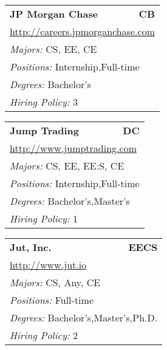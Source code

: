 \documentclass[twoside]{article}
\begin{document}
\begin{center}
\begin{multicols}{3}
\begin{FlushLeft}
\begin{minipage}{\columnwidth}
\end{minipage}
 
\begin{minipage}{\columnwidth}\begin{tabularx}{.95\columnwidth}{Xr}
                 {\Large\bf JP Morgan Chase} & {\Large\bf CB}\\
    \multicolumn{2}{p{.95\columnwidth}}{\url{http://careers.jpmorganchase.com}}\\
    \multicolumn{2}{p{.95\columnwidth}}{\emph{Majors:} CS, EE, CE}\\
    \multicolumn{2}{p{.95\columnwidth}}{\emph{Positions:} Internship,Full-time}\\
    \multicolumn{2}{p{.95\columnwidth}}{\emph{Degrees:} Bachelor's}\\
    \multicolumn{2}{p{.95\columnwidth}}{\emph{Hiring Policy:} 3}\\
    \end{tabularx}
    
\end{minipage}
 
\begin{minipage}{\columnwidth}\begin{tabularx}{.95\columnwidth}{Xr}
                 {\Large\bf Jump Trading} & {\Large\bf DC}\\
    \multicolumn{2}{p{.95\columnwidth}}{\url{http://www.jumptrading.com}}\\
    \multicolumn{2}{p{.95\columnwidth}}{\emph{Majors:} CS, EE, EE:S, CE}\\
    \multicolumn{2}{p{.95\columnwidth}}{\emph{Positions:} Internship,Full-time}\\
    \multicolumn{2}{p{.95\columnwidth}}{\emph{Degrees:} Bachelor's,Master's}\\
    \multicolumn{2}{p{.95\columnwidth}}{\emph{Hiring Policy:} 1}\\
    \end{tabularx}
    
\end{minipage}
 
\begin{minipage}{\columnwidth}\begin{tabularx}{.95\columnwidth}{Xr}
                 {\Large\bf Jut, Inc.} & {\Large\bf EECS}\\
    \multicolumn{2}{p{.95\columnwidth}}{\url{http://www.jut.io}}\\
    \multicolumn{2}{p{.95\columnwidth}}{\emph{Majors:} CS, Any, CE}\\
    \multicolumn{2}{p{.95\columnwidth}}{\emph{Positions:} Full-time}\\
    \multicolumn{2}{p{.95\columnwidth}}{\emph{Degrees:} Bachelor's,Master's,Ph.D.}\\
    \multicolumn{2}{p{.95\columnwidth}}{\emph{Hiring Policy:} 2}\\
    \end{tabularx}
    

\end{minipage}
\end{FlushLeft}
\end{multicols}
\end{center}
\end{document}
